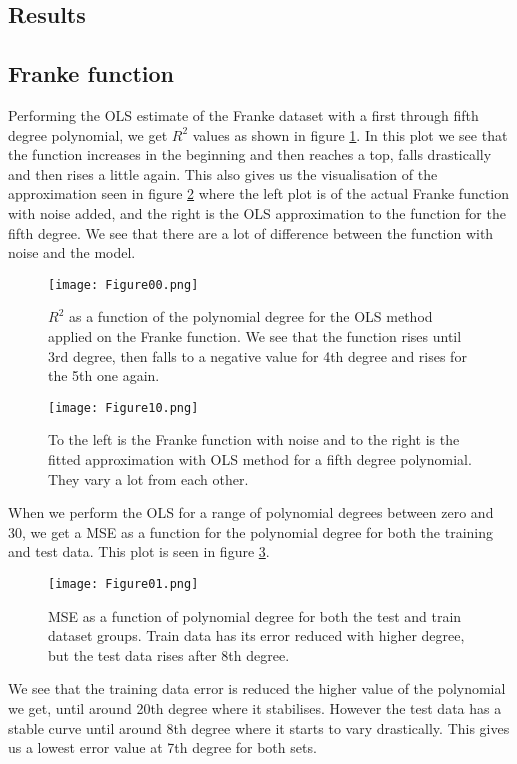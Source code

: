 \documentclass[11pt, A4paper, english]{article}
\begin{document}
\begin{multicols}{2}
		\section{Results}
			\subsection{Franke function}
Performing the OLS estimate of the Franke dataset with a first through fifth degree polynomial, we get $R^2$ values as shown in figure \ref{R2}. In this plot we see that the function increases in the beginning and then reaches a top, falls drastically and then rises a little again. This also gives us the visualisation of the approximation seen in figure \ref{3D_Franke} where the left plot is of the actual Franke function with noise added, and the right is the OLS approximation to the function for the fifth degree. We see that there are a lot of difference between the function with noise and the model.
			\begin{figure}[H]
\texttt{[image: Figure00.png]}
\caption{$R^2$ as a function of the polynomial degree for the OLS method applied on the Franke function. We see that the function rises until 3rd degree, then falls to a negative value for 4th degree and rises for the 5th one again.}
\label{R2}
			\end{figure}
			\begin{figure}[H]
\texttt{[image: Figure10.png]}
\caption{To the left is the Franke function with noise and to the right is the fitted approximation with OLS method for a fifth degree polynomial. They vary a lot from each other.}
\label{3D_Franke}
			\end{figure}
When we perform the OLS for a range of polynomial degrees between zero and 30, we get a MSE as a function for the polynomial degree for both the training and test data. This plot is seen in figure \ref{MSE_OSL}.
			\begin{figure}[H]
\texttt{[image: Figure01.png]}
\caption{MSE as a function of polynomial degree for both the test and train dataset groups. Train data has its error reduced with higher degree, but the test data rises after 8th degree.}
\label{MSE_OSL}
			\end{figure}
We see that the training data error is reduced the higher value of the polynomial we get, until around 20th degree where it stabilises. However the test data has a stable curve until around 8th degree where it starts to vary drastically. This gives us a lowest error value at 7th degree for both sets. \\

\end{multicols}
\end{document}

